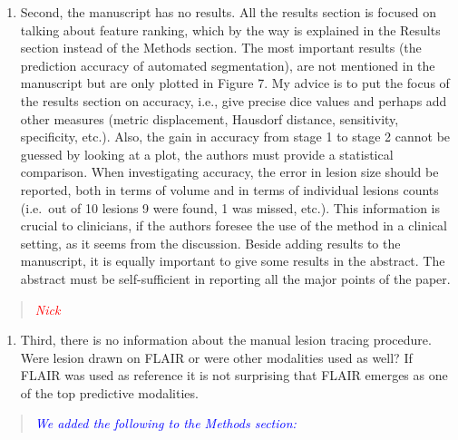 \documentclass[12pt,]{article}
\providecommand{\tightlist}{%
  \setlength{\itemsep}{0pt}\setlength{\parskip}{0pt}}
\begin{document}
\begin{enumerate}
\def\labelenumi{\arabic{enumi}.}
\setcounter{enumi}{1}
\tightlist
\item
  Second, the manuscript has no results. All the results section is
  focused on talking about feature ranking, which by the way is
  explained in the Results section instead of the Methods section. The
  most important results (the prediction accuracy of automated
  segmentation), are not mentioned in the manuscript but are only
  plotted in Figure 7. My advice is to put the focus of the results
  section on accuracy, i.e., give precise dice values and perhaps add
  other measures (metric displacement, Hausdorf distance, sensitivity,
  specificity, etc.). Also, the gain in accuracy from stage 1 to stage 2
  cannot be guessed by looking at a plot, the authors must provide a
  statistical comparison. When investigating accuracy, the error in
  lesion size should be reported, both in terms of volume and in terms
  of individual lesions counts (i.e.~out of 10 lesions 9 were found, 1
  was missed, etc.). This information is crucial to clinicians, if the
  authors foresee the use of the method in a clinical setting, as it
  seems from the discussion. Beside adding results to the manuscript, it
  is equally important to give some results in the abstract. The
  abstract must be self-sufficient in reporting all the major points of
  the paper.
\end{enumerate}

\begin{quote}
\emph{\textcolor{red}{Nick}}
\end{quote}

\begin{enumerate}
\def\labelenumi{\arabic{enumi}.}
\setcounter{enumi}{2}
\tightlist
\item
  Third, there is no information about the manual lesion tracing
  procedure. Were lesion drawn on FLAIR or were other modalities used as
  well? If FLAIR was used as reference it is not surprising that FLAIR
  emerges as one of the top predictive modalities.
\end{enumerate}

\begin{quote}
\emph{\textcolor{blue}{We added the following to the Methods section:}}
\end{quote}
\end{document}
